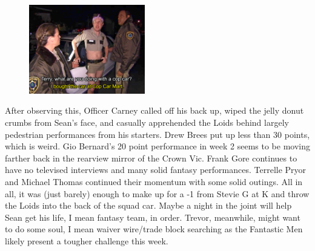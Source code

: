 \documentclass[11pt,letterpaper]{article}
\begin{document}
\begin{figure}
\centering
\includegraphics[width=0.45\textwidth]{week4-terry.png}
\label{fig:week4-terry}
\end{figure} 
\par\noindent After observing this, Officer Carney called off his back up, wiped the jelly donut crumbs from Sean's face, and casually apprehended the Loids behind largely pedestrian performances from his starters. Drew Brees put up less than 30 points, which is weird. Gio Bernard's 20 point performance in week 2 seems to be moving farther back in the rearview mirror of the Crown Vic. Frank Gore continues to have no televised interviews and many solid fantasy performances. Terrelle Pryor and Michael Thomas continued their momentum with some solid outings. All in all, it was (just barely) enough to make up for a -1 from Stevie G at K and throw the Loids into the back of the squad car. Maybe a night in the joint will help Sean get his life, I mean fantasy team, in order. Trevor, meanwhile, might want to do some soul, I mean waiver wire/trade block searching as the Fantastic Men likely present a tougher challenge this week. 
\end{document}
